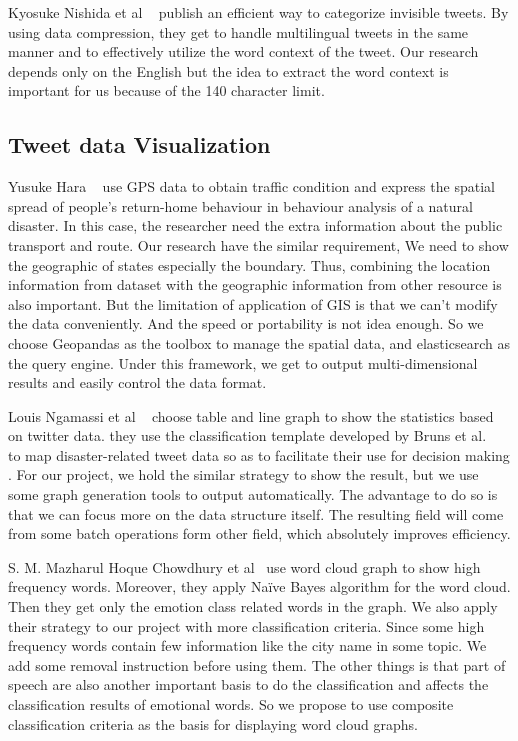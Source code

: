 Kyosuke Nishida et al ~\cite{nishida2011tweet} publish an efficient way to categorize invisible
tweets. By using data compression, they get to handle multilingual tweets in
the same manner and to effectively utilize the word context of the tweet. Our
research depends only on the English but the idea to extract the word context
is important for us because of the 140 character limit. 

\subsection{Tweet data Visualization}
Yusuke Hara ~\cite{hara2015behaviour} use GPS  data to obtain traffic condition and express  the
spatial  spread  of  people’s  return-home  behaviour in behaviour analysis
of a natural disaster. In this case, the researcher need the extra
information about the public transport and route. Our research have the
similar requirement, We need to show the geographic of states especially the
boundary. Thus, combining the location information from dataset with the
geographic information from other resource is also important. But the
limitation of application of GIS is that we can't modify the data
conveniently. And the speed or portability is not idea enough. So we choose
Geopandas as the toolbox to manage the spatial data, and elasticsearch as the
query engine. Under this framework, we get to output multi-dimensional
results and easily control the data format.

Louis Ngamassi et al ~\cite{ngamassi2022text} choose table and line graph to show the statistics
based on twitter data. they use the classification template developed by
Bruns et al. ~\cite{ngamassi2022text} to map disaster-related tweet data so as to facilitate their
use for decision making . For our project, we hold the similar strategy to
show the result, but we use some graph generation tools to output
automatically. The advantage to do so is that we can focus more on the data
structure itself. The resulting field will come from some batch operations
form other field, which absolutely improves efficiency.

S. M. Mazharul Hoque Chowdhury et al~\cite{chowdhury2019sentiment} use word cloud graph to show high
frequency words. Moreover, they apply Naïve Bayes algorithm for the word
cloud. Then they get only the emotion class related words in the graph. We
also apply their strategy to our project with more classification criteria.
Since some high frequency words contain few information like the city name in
some topic. We add some removal instruction before using them. The other
things is that part of speech are also another important basis to do the
classification and affects the classification results of emotional words. So
we propose to use composite classification criteria as the basis for
displaying word cloud graphs.